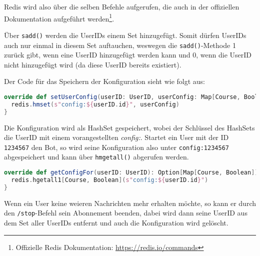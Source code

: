 Redis wird also über die selben Befehle aufgerufen, die auch in der offiziellen Dokumentation aufgeführt werden\footnote{Offizielle Redis Dokumentation: \url{https://redis.io/commands}}.

Über \texttt{sadd()} werden die UserIDs einem Set hinzugefügt. Somit dürfen UserIDs auch nur einmal in diesem Set auftauchen, weswegen die \texttt{sadd()}-Methode 1 zurück gibt, wenn eine UserID hinzugefügt werden kann und 0, wenn die UserID nicht hinzugefügt wird (da diese UserID bereits existiert).

Der Code für das Speichern der Konfiguration sieht wie folgt aus:

\begin{lstlisting}[language=scala, style=scala, caption=Setzen der Userkonfiguration]
override def setUserConfig(userID: UserID, userConfig: Map[Course, Boolean]): Boolean = {
  redis.hmset(s"config:${userID.id}", userConfig)
}
\end{lstlisting}

Die Konfiguration wird als HashSet gespeichert, wobei der Schlüssel des HashSets die UserID mit einem vorangestellten \textit{config:}. Startet ein User mit der ID \texttt{1234567} den Bot, so wird seine Konfiguration also unter \texttt{config:1234567} abgespeichert und kann über \texttt{hmgetall()} abgerufen werden.

\begin{lstlisting}[language=scala, style=scala, caption=Abrufen der Userkonfiguration]
override def getConfigFor(userID: UserID): Option[Map[Course, Boolean]] = {
  redis.hgetall1[Course, Boolean](s"config:${userID.id}")
}
\end{lstlisting}

Wenn ein User keine weieren Nachrichten mehr erhalten möchte, so kann er durch den \texttt{/stop}-Befehl sein Abonnement beenden, dabei wird dann seine UserID aus dem Set aller UserIDs entfernt und auch die Konfiguration wird gelöscht.
